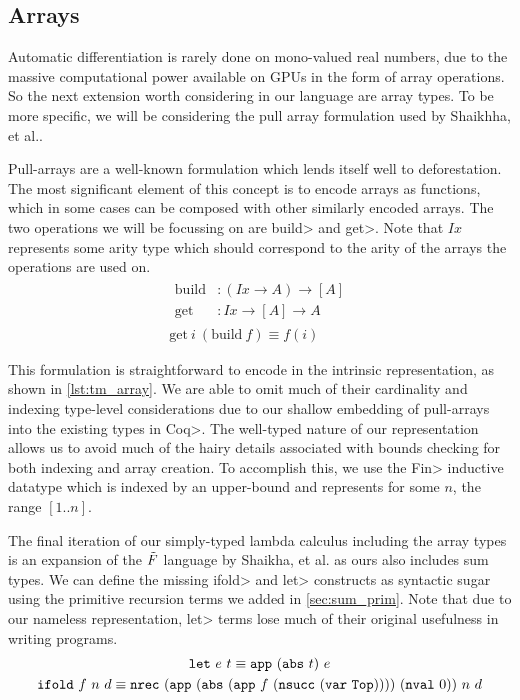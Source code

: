 \subsection{Arrays}\label{sec:arrays}
  Automatic differentiation is rarely done on mono-valued real numbers, due to the massive computational power available on GPUs in the form of array operations.
  So the next extension worth considering in our language are array types.
  To be more specific, we will be considering the pull array formulation used by Shaikhha, et al.\cite{Shaikha2019}.

  Pull-arrays are a well-known formulation which lends itself well to deforestation\cite{10.1145/165180.165214}.
  The most significant element of this concept is to encode arrays as functions, which in some cases can be composed with other similarly encoded arrays.
  The two operations we will be focussing on are \<build> and \<get>.
  Note that $Ix$ represents some arity type which should correspond to the arity of the arrays the operations are used on.
  \begin{gather*}
    \begin{aligned}
      \text{build} &: (Ix \rightarrow A) \rightarrow [A] \\
      \text{get} &: Ix \rightarrow [A] \rightarrow A
    \end{aligned} \\
    \text{get}\ i\ (\text{build}\ f) \equiv f(i)
  \end{gather*}

  This formulation is straightforward to encode in the intrinsic representation, as shown in \cref{lst:tm_array}.
  We are able to omit much of their cardinality and indexing type-level considerations due to our shallow embedding of pull-arrays into the existing types in \<Coq>.
  The well-typed nature of our representation allows us to avoid much of the hairy details associated with bounds checking for both indexing and array creation.
  To accomplish this, we use the \<Fin> inductive datatype which is indexed by an upper-bound and represents for some $n$, the range $[1..n]$.

  The final iteration of our simply-typed lambda calculus including the array types is an expansion of the $\tilde{F}$ language by Shaikha, et al. as ours also includes sum types.
  We can define the missing \<ifold> and \<let> constructs as syntactic sugar using the primitive recursion terms we added in \cref{sec:sum_prim}.
  Note that due to our nameless representation, \<let> terms lose much of their original usefulness in writing programs.
  \begin{gather*}
    \texttt{let}\ e\ t \equiv \texttt{app}\ (\texttt{abs}\ t)\ e \\
    \texttt{ifold}\ f\ n\ d \equiv
    \texttt{nrec}\ (\texttt{app}\ (\texttt{abs}\ (\texttt{app}\ f\ (\texttt{nsucc}\ (\texttt{var}\ \texttt{Top}))))\ (\texttt{nval}\ 0))\ n\ d
  \end{gather*}

